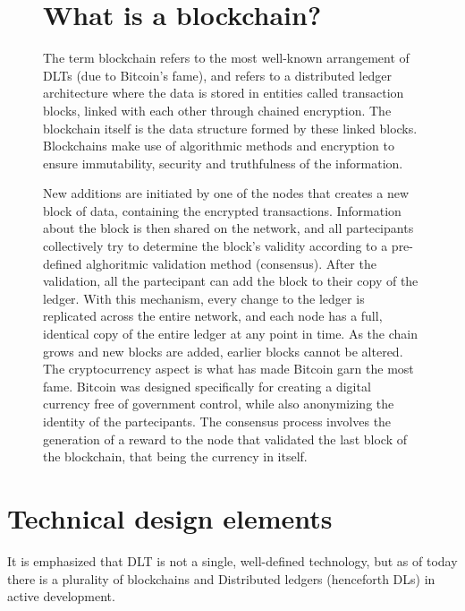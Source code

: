 \begin{figure}[h]
    \begin{tcolorbox}[colframe=boxcolor]
        \section*{What is a blockchain?}
        The term blockchain refers to the most well-known arrangement of DLTs (due to Bitcoin's fame), and refers to a distributed ledger architecture where the data is stored in entities called transaction blocks, linked with each other through chained encryption. The blockchain itself is the data structure formed by these linked blocks. Blockchains make use of algorithmic methods and encryption to ensure immutability, security and truthfulness of the information.
        
        New additions are initiated by one of the nodes that creates a new block of data, containing the encrypted transactions. Information about the block is then shared on the network, and all partecipants collectively try to determine the block's validity according to a pre-defined alghoritmic validation method (consensus). After the validation, all the partecipant can add the block to their copy of the ledger. With this mechanism, every change to the ledger is replicated across the entire network, and each node has a full, identical copy of the entire ledger at any point in time. As the chain grows and new blocks are added, earlier blocks cannot be altered. \\

        The cryptocurrency aspect is what has made Bitcoin garn the most fame. Bitcoin was designed specifically for creating a digital currency free of government control, while also anonymizing the identity of the partecipants.
        The consensus process involves the generation of a reward to the node that validated the last block of the blockchain, that being the currency in itself. 
    \end{tcolorbox}
\end{figure}
\newpage

\section{Technical design elements}

It is emphasized that DLT is not a single, well-defined technology, but as of today there is a plurality of blockchains and Distributed ledgers (henceforth DLs) in active development.

